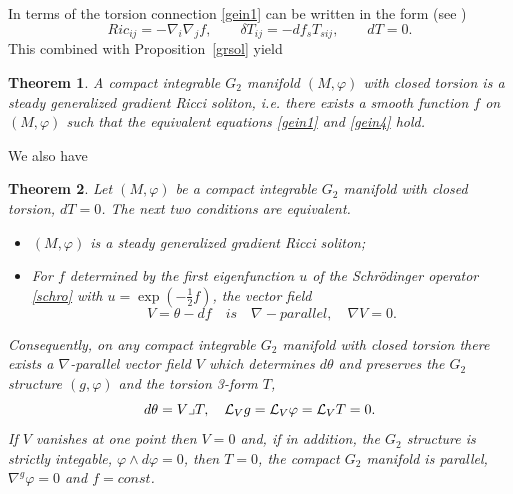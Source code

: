 \documentclass[10pt,british]{article}
\newtheorem{thrm}{Theorem}[section]
\def\d{\delta}
\def\sb {{\nabla}}
\def\LC{{\nabla^g}}
\def\p{{\varphi}}
\begin{document}
 In terms of the torsion connection \eqref{gein1} can be written in the form (see \cite{IS})
\begin{equation}\label{gein4}
Ric_{ij}=-\sb_i\sb_j f, \qquad \d T_{ij}=-df_sT_{sij}, \qquad dT=0.
\end{equation}
This combined with Proposition~\ref{grsol}  yield 
\begin{thrm}\label{nnnew}
A compact  integrable $G_2$ manifold  $(M,\p)$ with closed torsion is a steady generalized gradient Ricci soliton, i.e. there exists a smooth function $f$ on  $(M,\p)$ such that the equivalent equations \eqref{gein1} and \eqref{gein4} hold.
\end{thrm}
We also have
\begin{thrm}\label{inf}
Let $(M,\p)$ be a compact  integrable $G_2$ manifold with closed torsion, $dT=0$. The next two conditions are equivalent.
 \begin{itemize}
\item[a).] $(M,\p)$  is a steady generalized gradient Ricci soliton;
\item[b).]  For $f$ determined  by the first eigenfunction $u$ of the  Schr\"odinger operator \eqref{schro} with  $u=\exp(-\frac12f)$, the vector field $$V=\theta-df \quad  is \quad \sb-parallel, \quad \sb V=0.$$
\end{itemize}
Consequently, on any compact   integrable $G_2$ manifold with closed torsion there exists a $\sb$-parallel vector field $V$  which determines $d\theta$ and  preserves the $G_2$ structure $(g,\p)$  and the torsion 3-form $T$,
\begin{equation}\label{vsu3}
d\theta=V\lrcorner T, \quad {\cal{L}}_Vg={\cal{L}}_V\p={\cal{L}}_VT=0.
\end{equation}
If $V$ vanishes at one point then $V=0$ and, if in addition, the $G_2$ structure is strictly integable, $\p\wedge d\p=0$, then $T=0$, the compact $G_2$ manifold is parallel, $\LC\p=0$ and $f=const$.
\end{thrm}
\end{document}
